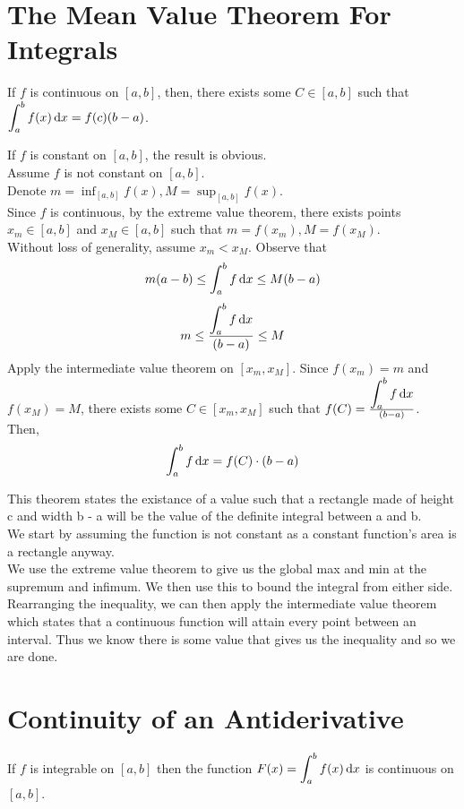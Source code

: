 \documentclass[12pt]{article}
\begin{document}
\section{The Mean Value Theorem For Integrals}
\begin{theo}{}
If \(f\) is continuous on \([a, b]\), then, there exists some \(C \in [a, b]\) such that \(\displaystyle\int_a^b f(x) \,\mathrm{d} x = f(c)(b-a)\).    
\end{theo}
\newpage
\begin{prf}{}
If \(f\) is constant on \([a, b]\), the result is obvious.\\
Assume \(f\) is not constant on \([a, b]\).\\
Denote \(m  = \displaystyle\inf_{[a, b]}f(x), M = \displaystyle\sup_{[a, b]}f(x)\).\\
Since \(f\) is continuous, by the extreme value theorem, there exists points \(x_m \in [a, b]\) and \(x_M \in [a, b]\) such that \(m = f(x_m), M = f(x_M)\).\\
Without loss of generality, assume \(x_m < x_M\). Observe that 
\[m(a-b) \le \displaystyle\int_a^b f\,\mathrm{d} x \le M(b-a)\]
\[m \le \frac{\displaystyle\int_a^b f\,\mathrm{d} x}{(b - a)} \le M\]
Apply the intermediate value theorem on \([x_m, x_M]\). Since \(f(x_m) = m\) and \(f(x_M) = M\), there exists some \(C \in [x_m, x_M]\) such that \(f(C) = \frac{\displaystyle\int_a^b f\,\mathrm{d} x}{(b-a)}\).\\
Then, \[\displaystyle\int_a^b f\,\mathrm{d} x = f(C)\cdot (b - a)\]
\end{prf}
\begin{explanation}
    This theorem states the existance of a value such that a rectangle made of height c and width b - a will be the value of the definite integral between a and b.\\
We start by assuming the function is not constant as a constant function's area is a rectangle anyway.\\
We use the extreme value theorem to give us the global max and min at the supremum and infimum. We then use this to bound the integral from either side. Rearranging the inequality, we can then apply the intermediate value theorem which states that a continuous function will attain every point between an interval. Thus we know there is some value that gives us the inequality and so we are done.\\
\end{explanation}


\newpage
\section{Continuity of an Antiderivative}
\begin{theo}{}
If \(f\) is integrable on \([a, b]\) then the function \(F(x) = \displaystyle\int_a^b f(x) \,\mathrm{d} x\) is continuous on \([a, b]\).   
\end{theo}
\end{document}
